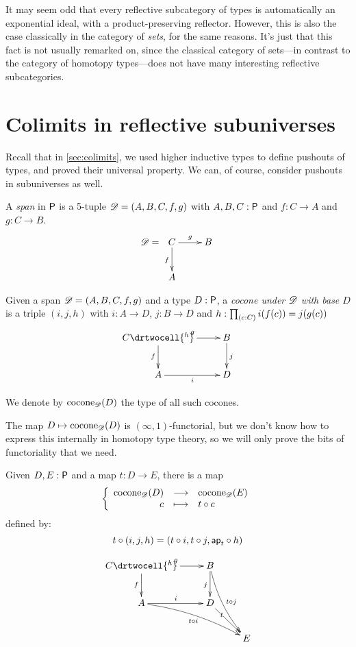 It may seem odd that every reflective subcategory of types is automatically an exponential ideal, with a product-preserving reflector.
However, this is also the case classically in the category of \emph{sets}, for the same reasons.
It's just that this fact is not usually remarked on, since the classical category of sets---in contrast to the category of homotopy
types---does not have many interesting reflective subcategories.


\section{Colimits in reflective subuniverses}
\label{sec:pushouts}

Recall that in \autoref{sec:colimits}, we used higher inductive types to define pushouts of types, and proved their universal property.
We can, of course, consider pushouts in subuniverses as well.

\begin{defn}
  A \emph{span} in $\P$ is a 5-tuple $\Ddiag=(A,B,C,f,g)$ with
  $A,B,C:\P$ and $f:C\to{}A$ and $g:C\to{}B$.
  \[\Ddiag=\xymatrix{C \ar^g[r] \ar_f[d] & B \\ A & }\]
\end{defn}

\begin{defn}
  Given a span $\Ddiag=(A,B,C,f,g)$ and a type $D:\P$, a
  \emph{cocone under $\Ddiag$ with base $D$} is a triple $(i, j, h)$ with
  $i:A\to{}D$, $j:B\to{}D$ and $h : \prd{c:C}i(f(c))=j(g(c))$
  \[\uppercurveobject{{ }}\lowercurveobject{{ }}\twocellhead{{ }}
  \xymatrix{C \ar^g[r] \ar_f[d] \drtwocell{^h} & B \ar^j[d] \\ A \ar_i[r] & D
  }\]

  We denote by $\cocone{\Ddiag}{D}$ the type of all such cocones.
\end{defn}

The map $D\mapsto\cocone{\Ddiag}{D}$ is $(\infty,1)$-functorial, but we don't
know how to express this internally in homotopy type theory, so we will only
prove the bits of functoriality that we need.

\begin{defn}
  Given $D,E:\P$ and a map $t:D\to{}E$, there is a map
  \[\function{\cocone{\Ddiag}{D}}{\cocone{\Ddiag}{E}}{c}{\composecocone{t}c}\]
  defined by:
  \[\composecocone{t}(i,j,h)=(t\circ{}i,t\circ{}j,\mapfunc{t}\circ{}h)\]

  \[\uppercurveobject{{ }}\lowercurveobject{{ }}\twocellhead{{ }}
  \xymatrix{C \ar^g[r] \ar_f[d] \drtwocell{^h} & B \ar_j[d]
    \ar@/_/^{t\circ{}j}[rdd] & \\
    A \ar^i[r] \ar@/^/_{t\circ{}i}[rrd] & D \ar[rd]|<<<<t & \\
    & & E }\]
\end{defn}

